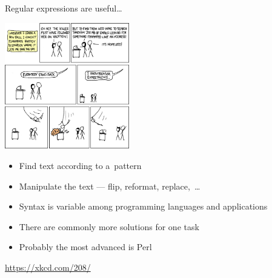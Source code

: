 \documentclass[compress, ucs, xelatex, 11pt, xcolor=svgnames,
  hyperref={
    bookmarks=true,
    unicode=true,
    colorlinks=true,
    pdftitle={Linux, command line and MetaCentrum},
    plainpages=false,
    pdfauthor={Vojtech Zeisek},
    pdfsubject={Course about use of Linux command line, writing shell scripts and using MetaCentrum of CESNET},
    pdfcreator={XeLaTeX},
    pdfkeywords={Linux, GNU, BASH, shell, command line, MetaCentrum},
    linkcolor=DarkRed,
    anchorcolor=DarkBlue,
    citecolor=Indigo,
    filecolor=NavyBlue,
    menucolor=DarkMagenta,
    urlcolor=DarkBlue,
    pdftex},
  url={hyphens, lowtilde} %
  ]{beamer}
\begin{document}
\begin{frame}{Regular expressions are useful\ldots}
  \begin{multicols}{2}
    \begin{center}
      \includegraphics[height=5.5cm]{regular_expressions.png}
    \end{center}
    \columnbreak
    \begin{itemize}
      \item Find text according to a~pattern
      \item Manipulate the text --- flip, reformat, replace,~\ldots
      \item Syntax is variable among programming languages and applications
      \item There are commonly more solutions for one task
      \item Probably the most advanced is Perl
    \end{itemize}
    \vfill
    \url{https://xkcd.com/208/}
  \end{multicols}
\end{frame}
\end{document}
